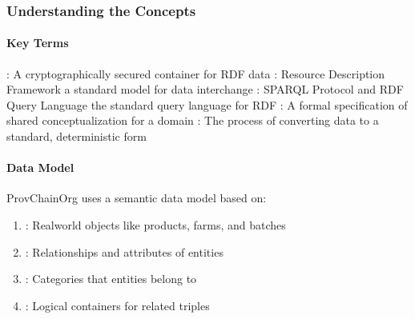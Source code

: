 \documentclass[letterpaper,10pt,english]{sphinxmanual}
\begin{document}
\subsubsection{Understanding the Concepts}
\label{\detokenize{user-guide/first-steps:understanding-the-concepts}}

\paragraph{Key Terms}
\label{\detokenize{user-guide/first-steps:key-terms}}
\sphinxAtStartPar
{}: A cryptographically secured container for RDF data
: Resource Description Framework \sphinxhyphen{} a standard model for data interchange
: SPARQL Protocol and RDF Query Language \sphinxhyphen{} the standard query language for RDF
: A formal specification of shared conceptualization for a domain
: The process of converting data to a standard, deterministic form


\paragraph{Data Model}
\label{\detokenize{user-guide/first-steps:data-model}}
\sphinxAtStartPar
ProvChainOrg uses a semantic data model based on:
\begin{enumerate}
%
\item {} 
\sphinxAtStartPar
{}: Real\sphinxhyphen{}world objects like products, farms, and batches

\item {} 
\sphinxAtStartPar
{}: Relationships and attributes of entities

\item {} 
\sphinxAtStartPar
{}: Categories that entities belong to

\item {} 
\sphinxAtStartPar
{}: Logical containers for related triples

\end{enumerate}
\end{document}
